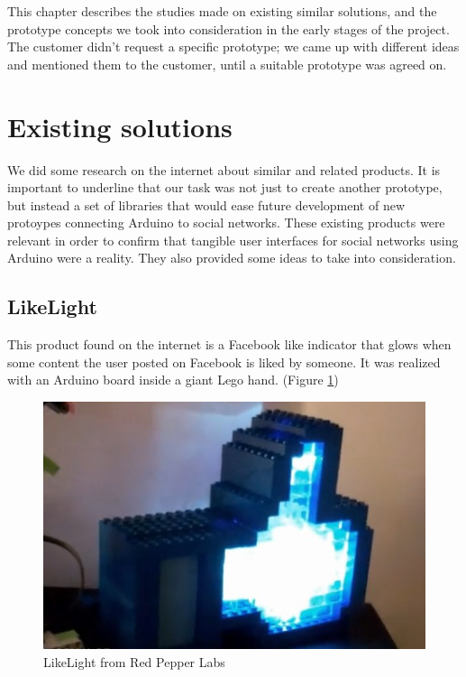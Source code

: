 
This chapter describes the studies made on existing similar solutions,
and the prototype concepts we took into consideration in the early stages of the project.
The customer didn't request a specific prototype; we came up with different ideas and mentioned
them to the customer, until a suitable prototype was agreed on.

\section{Existing solutions}
We did some research on the internet about similar and related products. It is important to underline that our task was
not just to create another prototype, but instead a set of libraries that would ease future development of new protoypes
connecting Arduino to social networks. These existing products were relevant in order to confirm that tangible user interfaces
for social networks using Arduino were a reality. They also provided some ideas to take into consideration.


\subsection{LikeLight}
This product found on the internet is a Facebook like indicator that glows when some content the
user posted on Facebook is liked by someone. It was realized with an Arduino board inside a giant Lego hand.
(Figure \ref{fig:prestudies-likehand})

\begin{figure}[h!]
\centering \includegraphics[scale=0.85]{img/prestudies-likehand}
\caption{LikeLight from Red Pepper Labs\cite{link:likelight}}
\label{fig:prestudies-likehand}
\end{figure}

